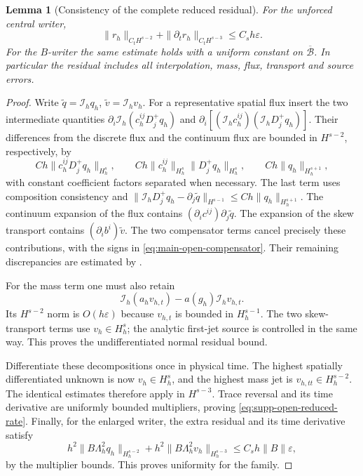 \documentclass[11pt]{article}
\numberwithin{equation}{section}
\newtheorem{lemma}[lemma]{Lemma}
\theoremstyle{definition}
\theoremstyle{remark}
\begin{document}
\begin{lemma}[Consistency of the complete reduced residual]
\label{lem:supp-open-reduced-consistency}
For the unforced central writer,
\begin{equation}
 \|r_h\|_{C_tH^{s-2}}+
 \|\partial_tr_h\|_{C_tH^{s-3}}\le C_sh\varepsilon.
 \label{eq:supp-open-reduced-rate}
\end{equation}
For the $B$-writer the same estimate holds with a uniform constant on
$\overline{\mathcal B}$.  In particular the residual includes all
interpolation, mass, flux, transport and source errors.
\end{lemma}
\begin{proof}
Write $\widetilde q=\mathcal I_hq_h$, $\widetilde v=\mathcal I_hv_h$.
For a representative spatial flux insert the two intermediate quantities
$\partial_i\mathcal I_h(c_h^{ij}D_j^+q_h)$ and
$\partial_i[(\mathcal I_hc_h^{ij})(\mathcal I_hD_j^+q_h)]$.
Their differences from the discrete flux and the continuum flux are bounded
in $H^{s-2}$, respectively, by
\[
 Ch\|c_h^{ij}D_j^+q_h\|_{H_h^s},\qquad
 Ch\|c_h^{ij}\|_{H_h^s}\|D_j^+q_h\|_{H_h^s},\qquad
 Ch\|q_h\|_{H_h^{s+1}},
\]
with constant coefficient factors separated when necessary.  The last term
uses composition consistency and
$\|\mathcal I_hD_j^+q_h-\partial_j\widetilde q\|_{H^{s-1}}
\le Ch\|q_h\|_{H_h^{s+1}}$.
The continuum expansion of the flux contains
$(\partial_ic^{ij})\partial_j\widetilde q$.  The expansion of the skew
transport contains $(\partial_ib^i)\widetilde v$.  The two compensator
terms cancel precisely these contributions, with the signs in
\eqref{eq:main-open-compensator}.  Their remaining discrepancies are
estimated by .

For the mass term one must also retain
\[
 \mathcal I_h(a_hv_{h,t})-a(g_h)\mathcal I_hv_{h,t}.
\]
Its $H^{s-2}$ norm is $O(h\varepsilon)$ because
$v_{h,t}$ is bounded in $H_h^{s-1}$.  The two skew-transport terms use
$v_h\in H_h^s$; the analytic first-jet source is controlled in the same
way.  This proves the undifferentiated normal residual bound.

Differentiate these decompositions once in physical time.  The highest
spatially differentiated unknown is now $v_h\in H_h^s$, and the highest
mass jet is $v_{h,tt}\in H_h^{s-2}$.  The identical estimates therefore
apply in $H^{s-3}$.  Trace reversal and its time derivative are uniformly
bounded multipliers, proving \eqref{eq:supp-open-reduced-rate}.  Finally,
for the enlarged writer, the extra residual and its time derivative satisfy
\[
 h^2\|B\Lambda_h^2q_h\|_{H_h^{s-2}}
 +h^2\|B\Lambda_h^2v_h\|_{H_h^{s-3}}
 \le C_sh\|B\|\varepsilon,
\]
by the multiplier bounds.  This proves uniformity for the family.
\end{proof}
\end{document}
